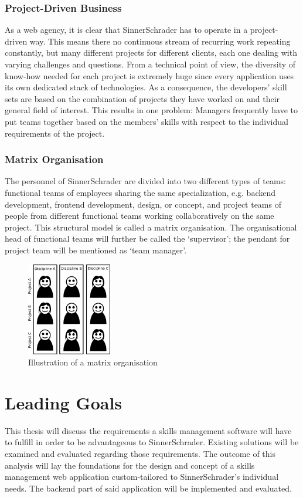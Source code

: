 \subsubsection{Project-Driven Business}
As a web agency, it is clear that SinnerSchrader has to operate in a project-driven way. This means there no continuous stream of recurring work repeating constantly, but many different projects for different clients, each one dealing with varying challenges and questions. From a technical point of view, the diversity of know-how needed for each project is extremely huge since every application uses its own dedicated stack of technologies. As a consequence, the developers’ skill sets are based on the combination of projects they have worked on and their general field of interest. This results in one problem: Managers frequently have to put teams together based on the members’ skills with respect to the individual requirements of the project.

\subsubsection{Matrix Organisation}
The personnel of SinnerSchrader are divided into two different types of teams: functional teams of
employees sharing the same specialization, e.g. backend development, frontend development, design, or concept, and project teams of people from different functional teams working collaboratively on the same project. This structural model is called a matrix organisation. \cite[P. 75]{BWL}
The organisational head of functional teams will further be called the `supervisor'; the pendant for project team will be mentioned as `team manager'.

\begin{figure}[!htp]
    \centering
    \includegraphics[width=0.33\textwidth]{images/matrixorga.png}
    \caption[Matrix Organisation]{Illustration of a matrix organisation}
    \label{fig:matrixorga}
\end{figure}



\section{Leading Goals}
This thesis will discuss the requirements a skills management software will have to fulfill in order to be advantageous to SinnerSchrader. Existing solutions will be examined and evaluated regarding those requirements. The outcome of this analysis will lay the foundations for the design and concept of a skills management web application custom-tailored to SinnerSchrader's individual needs. The backend part of said application will be implemented and evaluated.
